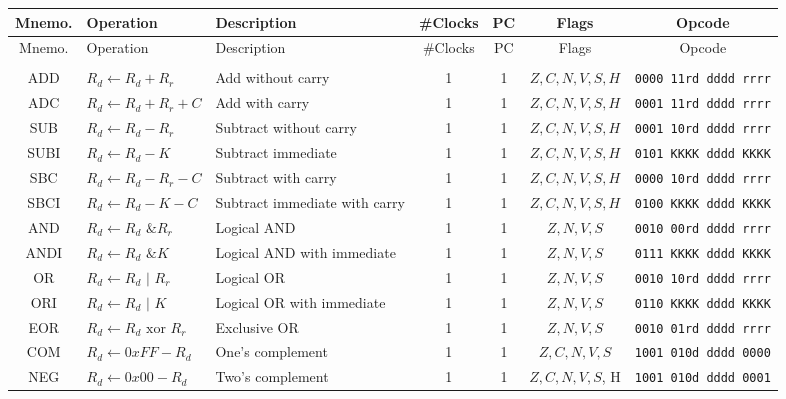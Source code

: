 \documentclass[11pt]{article}
\begin{document}
\tiny
\noindent\begin{center}
    \begin{longtable}{|c|m{10em}|l|c|c|c|c|}
\hline     \rowcolor{gray!10}
Mnemo. & Operation & Description & \#Clocks & PC & Flags & Opcode\\
\hline\hline
\endhead

\hline\hline \rowcolor{gray!10}
Mnemo. & Operation & Description & \#Clocks & PC & Flags & Opcode\\
\hline
\endfoot

 \rowcolor{gray!10}
\multicolumn{7}{|c|}{Arithmétique et logique} \\\hline
ADD & $R_d \leftarrow R_d + R_r$ & Add without carry & 1 & 1 & $Z, C, N, V, S, H$ & \texttt{0000 11rd dddd rrrr}\\
ADC & $R_d \leftarrow R_d + R_r + C$ & Add with carry & 1 & 1 & $Z, C, N, V, S, H$ & \texttt{0001 11rd dddd rrrr}\\
SUB & $R_d \leftarrow R_d - R_r$ & Subtract without carry & 1 & 1 & $Z, C, N, V, S, H$ & \texttt{0001 10rd dddd rrrr}\\
SUBI & $R_d \leftarrow R_d - K$ & Subtract immediate & 1 & 1 & $Z, C, N, V, S, H$ & \texttt{0101 KKKK dddd KKKK}\\
SBC & $R_d \leftarrow R_d - R_r - C$ & Subtract with carry & 1 & 1 & $Z, C, N, V, S, H$ & \texttt{0000 10rd dddd rrrr}\\
SBCI & $R_d \leftarrow R_d - K - C$ & Subtract immediate with carry & 1 & 1 & $Z, C, N, V, S, H$ & \texttt{0100 KKKK dddd KKKK}\\
AND & $R_d \leftarrow R_d \text{ \& } R_r$ & Logical AND & 1 & 1 & $Z, N, V, S$ & \texttt{0010 00rd dddd rrrr}\\
ANDI & $R_d \leftarrow R_d \text{ \& } K$ & Logical AND with immediate & 1 & 1 & $Z, N, V, S$ & \texttt{0111 KKKK dddd KKKK}\\
OR & $R_d \leftarrow R_d \text{ | } R_r$ & Logical OR & 1 & 1 & $Z, N, V, S$ & \texttt{0010 10rd dddd rrrr}\\
ORI & $R_d \leftarrow R_d \text{ | } K$ & Logical OR with immediate & 1 & 1 & $Z, N, V, S$ & \texttt{0110 KKKK dddd KKKK}\\
EOR & $R_d \leftarrow R_d \text{ xor } R_r$ & Exclusive OR & 1 & 1 & $Z, N, V, S$ & \texttt{0010 01rd dddd rrrr}\\
COM & $R_d \leftarrow 0xFF - R_d$ & One's complement & 1 & 1 & $Z, C, N, V, S$ & \texttt{1001 010d dddd 0000}\\
NEG & $R_d \leftarrow 0x00 - R_d$ & Two's complement & 1 & 1 & $Z, C, N, V, S$, H & \texttt{1001 010d dddd 0001}\\

\end{longtable}
\end{center}
\end{document}
